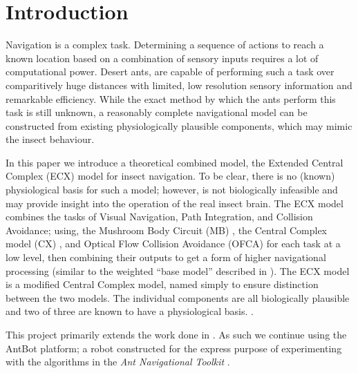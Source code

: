 \documentclass[a4paper,11pt,twoside,openright]{article}
\let\oldsection\section
\def\section{\cleardoublepage\oldsection}
\begin{document}

\raggedright

\section{ Introduction }
Navigation is a complex task. Determining a sequence of actions to reach a
known location based on a combination of sensory inputs requires a lot of
computational power. Desert ants, are capable of performing such a task
over comparitively huge distances with limited, low resolution sensory
information and remarkable efficiency. While the exact method by which
the ants perform this task is still unknown, a reasonably complete navigational
model can be constructed from existing physiologically plausible components,
which may mimic the insect behaviour.
\newline
\par

In this paper we introduce a theoretical combined model, the Extended
Central Complex (ECX) model for insect navigation. To be clear, there
is no (known) physiological basis for such a model; however, is not
biologically infeasible and may provide insight into the operation of
the real insect brain. The ECX model combines the tasks of Visual
Navigation, Path Integration, and Collision Avoidance; using, the
Mushroom Body Circuit (MB) \cite{Ardin2016}, the Central Complex model
(CX) \cite{Stone2017}, and Optical Flow Collision Avoidance (OFCA)
\cite{Mitchell2018, Stewart2010} for each task at a low level, then
combining their outputs to get a form of higher navigational processing
(similar to the weighted ``base model'' described in \cite{Webb2019}).
The ECX model is a modified Central Complex model, named simply to
ensure distinction between the two models. The individual components
are all biologically plausible and two of three are known to have a
physiological basis. \cite{Ardin2016, Stone2017, Mitchell2018,
  Stewart2010, Julien2017}.
\newline
\par

This project primarily extends the work done in
\cite{Mitchell2018}. As such we continue using the AntBot platform; a
robot constructed for the express purpose of experimenting with the
algorithms in the \textit{Ant Navigational Toolkit}
\cite{Eberding2016, Wehner2009}.
\end{document}
